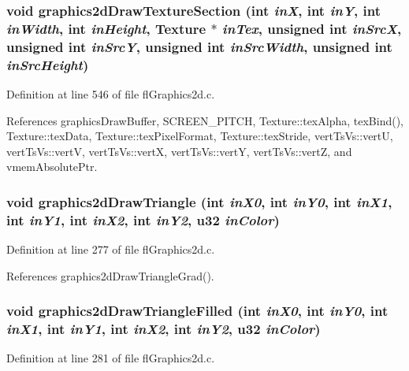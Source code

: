 \subsubsection{\setlength{\rightskip}{0pt plus 5cm}void graphics2d\-Draw\-Texture\-Section (int {\em in\-X}, int {\em in\-Y}, int {\em in\-Width}, int {\em in\-Height}, {\bf Texture} $\ast$ {\em in\-Tex}, unsigned int {\em in\-Src\-X}, unsigned int {\em in\-Src\-Y}, unsigned int {\em in\-Src\-Width}, unsigned int {\em in\-Src\-Height})}\label{flGraphics2d_8h_f98a19591e7c77534158c6085627bfe2}




Definition at line 546 of file fl\-Graphics2d.c.

References graphics\-Draw\-Buffer, SCREEN\_\-PITCH, Texture::tex\-Alpha, tex\-Bind(), Texture::tex\-Data, Texture::tex\-Pixel\-Format, Texture::tex\-Stride, vert\-Ts\-Vs::vert\-U, vert\-Ts\-Vs::vert\-V, vert\-Ts\-Vs::vert\-X, vert\-Ts\-Vs::vert\-Y, vert\-Ts\-Vs::vert\-Z, and vmem\-Absolute\-Ptr.
\subsubsection{\setlength{\rightskip}{0pt plus 5cm}void graphics2d\-Draw\-Triangle (int {\em in\-X0}, int {\em in\-Y0}, int {\em in\-X1}, int {\em in\-Y1}, int {\em in\-X2}, int {\em in\-Y2}, u32 {\em in\-Color})}\label{flGraphics2d_8h_2134a34ded663ac28ea07c7e45527275}




Definition at line 277 of file fl\-Graphics2d.c.

References graphics2d\-Draw\-Triangle\-Grad().
\subsubsection{\setlength{\rightskip}{0pt plus 5cm}void graphics2d\-Draw\-Triangle\-Filled (int {\em in\-X0}, int {\em in\-Y0}, int {\em in\-X1}, int {\em in\-Y1}, int {\em in\-X2}, int {\em in\-Y2}, u32 {\em in\-Color})}\label{flGraphics2d_8h_88e42b65fc55f6b1095af9789e3de3f8}




Definition at line 281 of file fl\-Graphics2d.c.

